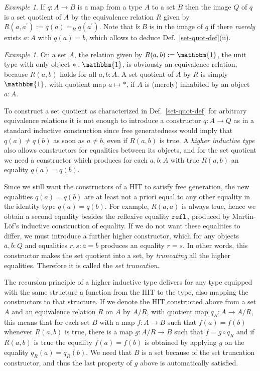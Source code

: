 \documentclass{amsart}
\theoremstyle{plain}
\numberwithin{equation}{section} %
\numberwithin{figure}{section} %
\theoremstyle{plain}
\theoremstyle{plain}
\theoremstyle{plain}
\theoremstyle{plain}
\theoremstyle{plain}
\theoremstyle{plain}
\theoremstyle{remark}
\theoremstyle{remark}
\theoremstyle{remark}
\newtheorem{exm}[thm]{Example}
\begin{document}
\begin{exm}    %
If $q: A \rightarrow B$ is a map from a type $A$ to a set $B$ then the image $Q$ of $q$ is a set quotient of $A$ by the equivalence relation $R$ given by $R(a, a^\prime) := q(a) =_B q(a^\prime)$. Note that $b : B$ is in the image of $q$ if there \textit{merely} exists $a : A$ with $q(a) = b$, which allows to deduce Def.~\ref{set-quot-def}(ii).
\end{exm}

\begin{exm} \label{surj-equiv-exm}  %
On a set $A$, the relation given by $R(a,b) := \mathbbm{1}$, the unit type with only object $\ast : \mathbbm{1}$, is obviously an equivalence relation, because $R(a,b)$ holds for all $a, b : A$. A set quotient of $A$ by $R$ is simply $\mathbbm{1}$, with quotient map $a \mapsto \ast$, if $A$ is (merely) inhabited by an object $a : A$.
\end{exm}

To construct a set quotient as characterized in Def.~\ref{set-quot-def} for arbitrary equivalence relations it is not enough to introduce a constructor $q : A \rightarrow Q$ as in a standard inductive construction since free generatedness would imply that $q(a) \neq q(b)$ as soon as $a \neq b$, even if $R(a, b)$ is true. A \textit{higher inductive type} also allows constructors for equalities between its objects, and for the set quotient we need a constructor which produces for each $a, b : A$ with true $R(a, b)$ an equality $q(a) = q(b)$. 

Since we still want the constructors of a HIT to satisfy free generation, the new equalities $q(a) = q(b)$ are at least not a priori equal to any other equality in the identity type $q(a) = q(b)$. For example, $R(a, a)$ is always true, hence we obtain a second equality besides the reflexive equality $\mathtt{refl}_a$ produced by Martin-L\"of's inductive construction of equality. If we do not want these equalities to differ, we must introduce a further higher constructor, which for any objects $\overline{a}, \overline{b} : Q$ and equalities $r, s : \overline{a} = \overline{b}$ produces an equality $r = s$. In other words, this constructor makes the set quotient into a set, by \textit{truncating} all the higher equalities. Therefore it is called the \textit{set truncation}.

The recursion principle of a higher inductive type delivers for any type equipped with the same structure a function from the HIT to the type, also mapping the constructors to that structure. If we denote the HIT constructed above from a set $A$ and an equivalence relation $R$ on $A$ by $A/R$, with quotient map $q_R : A \rightarrow A/R$, this means that for each set $B$ with a map $f : A \rightarrow B$ such that $f(a) = f(b)$ whenever $R(a, b)$ is true, there is a map $g : A/R \rightarrow B$ such that $f = g \circ q_R$ and if $R(a, b)$ is true the equality $f(a) = f(b)$ is obtained by applying $g$ on the equality $q_R(a) = q_R(b)$. We need that $B$ is a set because of the set truncation constructor, and thus the last property of $g$ above is automatically satisfied.
\end{document}

